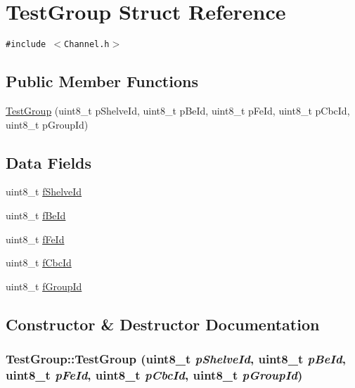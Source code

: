 \hypertarget{struct_test_group}{
\section{Test\-Group Struct Reference}
\label{struct_test_group}
}
{\tt \#include $<$Channel.h$>$}

\subsection*{Public Member Functions}
\begin{CompactItemize}
\item 
\hyperlink{struct_test_group_0eada91277019eed00ac4162916fea16}{Test\-Group} (uint8\_\-t p\-Shelve\-Id, uint8\_\-t p\-Be\-Id, uint8\_\-t p\-Fe\-Id, uint8\_\-t p\-Cbc\-Id, uint8\_\-t p\-Group\-Id)
\end{CompactItemize}
\subsection*{Data Fields}
\begin{CompactItemize}
\item 
uint8\_\-t \hyperlink{struct_test_group_1e7aaad7924e3eae8d381adee67173d0}{f\-Shelve\-Id}
\item 
uint8\_\-t \hyperlink{struct_test_group_220aae8ee3ae8c357f1787e3625431b4}{f\-Be\-Id}
\item 
uint8\_\-t \hyperlink{struct_test_group_0eaafe2a6411b3865c90240b36b24840}{f\-Fe\-Id}
\item 
uint8\_\-t \hyperlink{struct_test_group_c29315115540d3e0fc74b2dba3771162}{f\-Cbc\-Id}
\item 
uint8\_\-t \hyperlink{struct_test_group_425092488cd04f3f22fdf8dfe0e877ed}{f\-Group\-Id}
\end{CompactItemize}


\subsection{Constructor \& Destructor Documentation}
\hypertarget{struct_test_group_0eada91277019eed00ac4162916fea16}{
\subsubsection[TestGroup]{\setlength{\rightskip}{0pt plus 5cm}Test\-Group::Test\-Group (uint8\_\-t {\em p\-Shelve\-Id}, uint8\_\-t {\em p\-Be\-Id}, uint8\_\-t {\em p\-Fe\-Id}, uint8\_\-t {\em p\-Cbc\-Id}, uint8\_\-t {\em p\-Group\-Id})}}
\label{struct_test_group_0eada91277019eed00ac4162916fea16}




